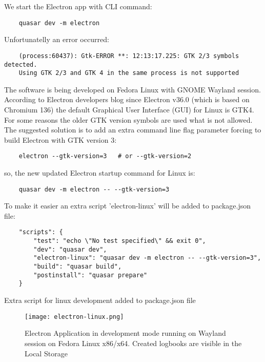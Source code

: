 We start the Electron app with CLI command:

\begin{verbatim}
    quasar dev -m electron
\end{verbatim}

Unfortunatelly an error occurred:

\begin{verbatim}
    (process:60437): Gtk-ERROR **: 12:13:17.225: GTK 2/3 symbols detected. 
    Using GTK 2/3 and GTK 4 in the same process is not supported
\end{verbatim}

The software is being developed on Fedora Linux with GNOME Wayland session. According to Electron developers blog \autocite{ElectronGTK4} since Electron v36.0 (which is based on Chromium 136) the default Graphical User Interface (GUI) for Linux is GTK4. For some reasons the older GTK version symbols are used what is not allowed. The suggested solution is to add an extra command line flag parameter forcing to build Electron with GTK version 3:

\begin{verbatim}
    electron --gtk-version=3   # or --gtk-version=2
\end{verbatim}

so, the new updated Electron startup command for Linux is:

\begin{verbatim}
    quasar dev -m electron -- --gtk-version=3
\end{verbatim}

To make it easier an extra script 'electron-linux' will be added to package.json file:

\begin{listing}[H]
    \begin{verbatim}
    "scripts": {
        "test": "echo \"No test specified\" && exit 0",
        "dev": "quasar dev",
        "electron-linux": "quasar dev -m electron -- --gtk-version=3",
        "build": "quasar build",
        "postinstall": "quasar prepare"
    }
    \end{verbatim}
\caption[Quasar scripts in package.json file]{Extra script for linux development added to package.json file}
\end{listing}


\begin{figure}
    \centering
    \texttt{[image: electron-linux.png]}
    \caption[Electron development mode]{\label{fig:electronlinux} Electron Application in development mode running on Wayland session on Fedora Linux x86/x64. Created logbooks are visible in the Local Storage }
\end{figure}




